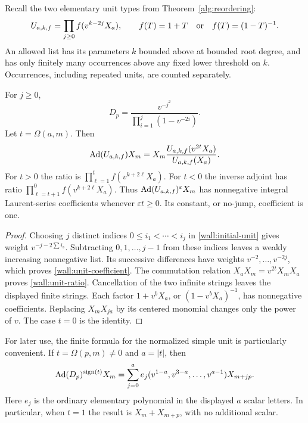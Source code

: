 Recall the two elementary unit types from Theorem~\ref{alg:reordering}:
\[
 U_{a,k,f}=\prod_{j\ge0}f(v^{k-2j}X_a),\qquad
 f(T)=1+T\quad\hbox{or}\quad f(T)=(1-T)^{-1}.
\]
An allowed list has its parameters $k$ bounded above at bounded root
degree, and has only finitely many occurrences above any fixed lower
threshold on $k$.  Occurrences, including repeated units, are counted
separately.

\begin{lemma}
\label{wall:unit}
For $j\ge0$,
\begin{equation}
 [X_{jp}]D_p=
 \frac{v^{-j^2}}{\prod_{i=1}^j(1-v^{-2i})}.
 \label{wall:unit-coefficient}
\end{equation}
Let $t=\Omega(a,m)$.  Then
\begin{equation}
 \operatorname{Ad}(U_{a,k,f})X_m
 =X_m\frac{U_{a,k,f}(v^{2t}X_a)}{U_{a,k,f}(X_a)}.
 \label{wall:unit-ratio}
\end{equation}
For $t>0$ the ratio is $\prod_{\ell=1}^t f(v^{k+2\ell}X_a)$.
For $t<0$ the inverse adjoint has ratio
$\prod_{\ell=t+1}^{0}f(v^{k+2\ell}X_a)$.
Thus $\operatorname{Ad}(U_{a,k,f})^\varepsilon X_m$ has nonnegative integral
Laurent-series coefficients whenever $\varepsilon t\ge0$.
Its constant, or no-jump, coefficient is one.
\end{lemma}

\begin{proof}
Choosing $j$ distinct indices $0\le i_1<\cdots<i_j$ in
\eqref{wall:initial-unit} gives weight
$v^{-j-2\sum i_s}$.  Subtracting $0,1,\ldots,j-1$ from these indices
leaves a weakly increasing nonnegative list.  Its successive
differences have weights $v^{-2},\ldots,v^{-2j}$, which proves
\eqref{wall:unit-coefficient}.  The commutation relation
$X_aX_m=v^{2t}X_mX_a$ proves \eqref{wall:unit-ratio}.  Cancellation of
the two infinite strings leaves the displayed finite strings.
Each factor $1+v^bX_a$, or $(1-v^bX_a)^{-1}$, has nonnegative
coefficients.  Replacing $X_mX_{ja}$ by its centered monomial changes
only the power of $v$.  The case $t=0$ is the identity.
\end{proof}

For later use, the finite formula for the normalized simple unit is
particularly convenient.  If $t=\Omega(p,m)\ne0$ and $a=|t|$, then
\begin{equation}
 \operatorname{Ad}(D_p)^{\operatorname{sign}(t)}X_m
 =\sum_{j=0}^a
 e_j(v^{1-a},v^{3-a},\ldots,v^{a-1})X_{m+jp}.
 \label{wall:binomial}
\end{equation}
Here $e_j$ is the ordinary elementary polynomial in the displayed
$a$ scalar letters.  In particular, when $t=1$ the result is
$X_m+X_{m+p}$, with no additional scalar.

